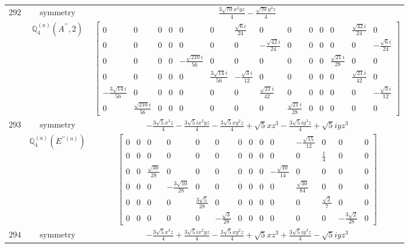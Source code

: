 \documentclass[fleqn,8pt,landscape]{jsarticle}
\begin{document}
\begin{longtable}{ccc}
$ 292 $ & $ \text{symmetry} $ & $ \frac{3 \sqrt{70} x^{2} y z}{4} - \frac{\sqrt{70} y^{3} z}{4} $ \\
$  $ & $ \mathbb{Q}_{4}^{(a)}(A^{\prime\prime},2) $ & $ \begin{bmatrix} 0 & 0 & 0 & 0 & 0 & 0 & \frac{\sqrt{6} i}{24} & 0 & 0 & 0 & 0 & 0 & \frac{\sqrt{42} i}{24} & 0 \\ 0 & 0 & 0 & 0 & 0 & 0 & 0 & - \frac{\sqrt{42} i}{24} & 0 & 0 & 0 & 0 & 0 & - \frac{\sqrt{6} i}{24} \\ 0 & 0 & 0 & 0 & - \frac{\sqrt{210} i}{56} & 0 & 0 & 0 & 0 & 0 & 0 & \frac{\sqrt{21} i}{28} & 0 & 0 \\ 0 & 0 & 0 & 0 & 0 & \frac{3 \sqrt{14} i}{56} & - \frac{\sqrt{3} i}{12} & 0 & 0 & 0 & 0 & 0 & \frac{\sqrt{21} i}{42} & 0 \\ - \frac{3 \sqrt{14} i}{56} & 0 & 0 & 0 & 0 & 0 & 0 & \frac{\sqrt{21} i}{42} & 0 & 0 & 0 & 0 & 0 & - \frac{\sqrt{3} i}{12} \\ 0 & \frac{\sqrt{210} i}{56} & 0 & 0 & 0 & 0 & 0 & 0 & \frac{\sqrt{21} i}{28} & 0 & 0 & 0 & 0 & 0 \end{bmatrix} $ \\ \hline
$ 293 $ & $ \text{symmetry} $ & $ - \frac{3 \sqrt{5} x^{3} z}{4} - \frac{3 \sqrt{5} i x^{2} y z}{4} - \frac{3 \sqrt{5} x y^{2} z}{4} + \sqrt{5} x z^{3} - \frac{3 \sqrt{5} i y^{3} z}{4} + \sqrt{5} i y z^{3} $ \\
$  $ & $ \mathbb{Q}_{4}^{(a)}(E^{\prime\prime(a)}) $ & $ \begin{bmatrix} 0 & 0 & 0 & 0 & 0 & 0 & 0 & 0 & 0 & 0 & - \frac{\sqrt{15}}{12} & 0 & 0 & 0 \\ 0 & 0 & 0 & 0 & 0 & 0 & 0 & 0 & 0 & 0 & 0 & \frac{1}{4} & 0 & 0 \\ 0 & 0 & \frac{\sqrt{30}}{28} & 0 & 0 & 0 & 0 & 0 & 0 & - \frac{\sqrt{10}}{14} & 0 & 0 & 0 & 0 \\ 0 & 0 & 0 & - \frac{3 \sqrt{10}}{28} & 0 & 0 & 0 & 0 & 0 & 0 & \frac{\sqrt{30}}{84} & 0 & 0 & 0 \\ 0 & 0 & 0 & 0 & \frac{3 \sqrt{5}}{28} & 0 & 0 & 0 & 0 & 0 & 0 & \frac{\sqrt{2}}{7} & 0 & 0 \\ 0 & 0 & 0 & 0 & 0 & - \frac{\sqrt{3}}{28} & 0 & 0 & 0 & 0 & 0 & 0 & - \frac{3 \sqrt{2}}{28} & 0 \end{bmatrix} $ \\ \hline
$ 294 $ & $ \text{symmetry} $ & $ - \frac{3 \sqrt{5} x^{3} z}{4} + \frac{3 \sqrt{5} i x^{2} y z}{4} - \frac{3 \sqrt{5} x y^{2} z}{4} + \sqrt{5} x z^{3} + \frac{3 \sqrt{5} i y^{3} z}{4} - \sqrt{5} i y z^{3} $ \\

\end{longtable}
\end{document}
